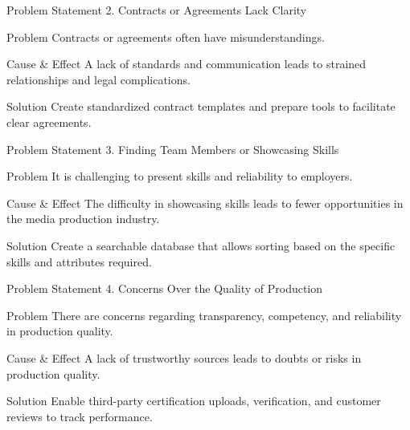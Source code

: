 \documentclass[aspectratio=169]{beamer}
\begin{document}
\begin{frame}{Problem Statement}
    2. Contracts or Agreements Lack Clarity
    \begin{alertblock}{Problem}
        Contracts or agreements often have misunderstandings.
    \end{alertblock}

    \begin{block}{Cause \& Effect}
        A lack of standards and communication leads to strained relationships and legal complications.
    \end{block}

    \begin{exampleblock}{Solution}
        Create standardized contract templates and prepare tools to facilitate clear agreements.
    \end{exampleblock}

\end{frame}

\begin{frame}{Problem Statement}
    3. Finding Team Members or Showcasing Skills
    \begin{alertblock}{Problem}
        It is challenging to present skills and reliability to employers.
    \end{alertblock}

    \begin{block}{Cause \& Effect}
        The difficulty in showcasing skills leads to fewer opportunities in the media production industry.
    \end{block}

    \begin{exampleblock}{Solution}
        Create a searchable database that allows sorting based on the specific skills and attributes required.
    \end{exampleblock}

\end{frame}

\begin{frame}{Problem Statement}
    4. Concerns Over the Quality of Production
    \begin{alertblock}{Problem}
        There are concerns regarding transparency, competency, and reliability in production quality.
    \end{alertblock}

    \begin{block}{Cause \& Effect}
        A lack of trustworthy sources leads to doubts or risks in production quality.
    \end{block}

    \begin{exampleblock}{Solution}
        Enable third-party certification uploads, verification, and customer reviews to track performance.
    \end{exampleblock}

\end{frame}
\end{document}

